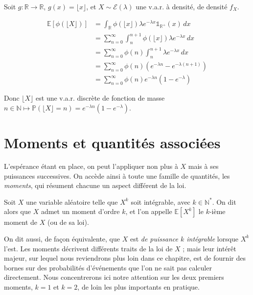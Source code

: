 \begin{exemple} 
Soit $g : \mathbb{R} \to \mathbb{R}$, $g(x) = \lfloor x \rfloor$, et $X \sim \mathcal{E}(\lambda)$ une v.a.r. à densité, de densité $f_X$.

\begin{align*}
\mathbb{E}[\phi(\lfloor X \rfloor)] &= \int_{\mathbb{R}} \phi(\lfloor x \rfloor) \lambda e^{-\lambda x} \mathbb{1}_{\mathbb{R}^+}(x) \, dx \\
&= \sum_{n=0}^\infty \int_n^{n+1} \phi(\lfloor x \rfloor) \lambda e^{-\lambda x} \, dx \\
&= \sum_{n=0}^\infty \phi(n) \int_n^{n+1} \lambda e^{-\lambda x} \, dx \\
&= \sum_{n=0}^\infty \phi(n) (e^{-\lambda n} - e^{-\lambda(n+1)}) \\
&= \sum_{n=0}^\infty \phi(n) e^{-\lambda n} (1 - e^{-\lambda}) 
\end{align*}

Donc $\lfloor X \rfloor$ est une v.a.r. discrète de fonction de masse $n \in \mathbb{N} \mapsto \mathbb{P}(\lfloor X \rfloor = n) = e^{-\lambda n}(1 - e^{-\lambda})$.
\end{exemple}

\section{Moments et quantités associées}

L'espérance étant en place, on peut l'appliquer non plus à $X$ mais à ses puissances successives. On accède ainsi à toute une famille de quantités, les \emph{moments}, qui résument chacune un aspect différent de la loi.

\medskip

\begin{mdframed}
\begin{definition}
Soit $X$ une variable aléatoire telle que $X^k$ soit intégrable, avec $k \in \mathbb{N}^*$. On dit alors que $X$ admet un moment d'ordre $k$, et l'on appelle $\mathbb{E}[X^k]$ le $k$-ième moment de $X$ (ou de sa loi).
\end{definition}
\end{mdframed}

On dit aussi, de façon équivalente, que $X$ est \emph{de puissance $k$ intégrable} lorsque $X^k$ l'est. Les moments décrivent différents traits de la loi de $X$ ; mais leur intérêt majeur, sur lequel nous reviendrons plus loin dans ce chapitre, est de fournir des bornes sur des probabilités d'événements que l'on ne sait pas calculer directement. Nous concentrerons ici notre attention sur les deux premiers moments, $k = 1$ et $k = 2$, de loin les plus importants en pratique.

